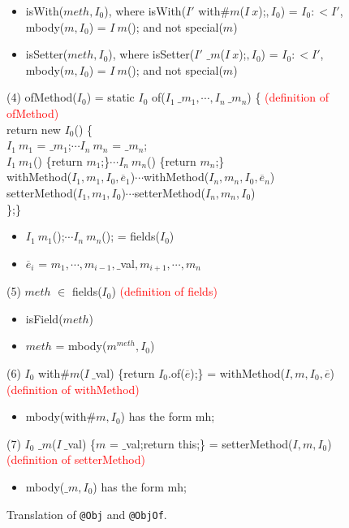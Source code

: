 \begin{figure*}
\begin{itemize}
    \item \textsf{isWith(}$meth,I_0$\textsf{)}, where \textsf{isWith(}$I'$ \textsf{with}$\#m$\textsf{(}$I\ x$\textsf{);}$,I_0$\textsf{)} = $I_0 :< I'$, \textsf{mbody(}$m,I_0$\textsf{)} = $I\ m$\textsf{();} and not \textsf{special(}$m$\textsf{)}
    \item \textsf{isSetter(}$meth,I_0$\textsf{)}, where \textsf{isSetter(}$I'$ $\_m$\textsf{(}$I\ x$\textsf{);}$,I_0$\textsf{)} = $I_0 :< I'$, \textsf{mbody(}$m,I_0$\textsf{)} = $I\ m$\textsf{();} and not \textsf{special(}$m$\textsf{)}
    \end{itemize}
(4) \textsf{ofMethod(}$I_0$\textsf{)} = \textsf{static }$I_0$\textsf{ of(}$I_1\ \_m_1,\cdots,I_n\ \_m_n$\textsf{) \{} \textcolor{red}{(definition of ofMethod)}
    \\ \textsf{return new }$I_0$\textsf{() \{}
    \\ $I_1\ m_1$ = $\_m_1$\textsf{;}$\cdots I_n\ m_n$ = $\_m_n$\textsf{;}
    \\ $I_1\ m_1$\textsf{() \{return }$m_1$\textsf{;\}}$\cdots I_n\ m_n$\textsf{() \{return }$m_n$\textsf{;\}}
    \\ \textsf{withMethod(}$I_1,m_1,I_0,\overline{e}_1$\textsf{)}$\cdots$\textsf{withMethod(}$I_n,m_n,I_0,\overline{e}_n$\textsf{)}
    \\ \textsf{setterMethod(}$I_1,m_1,I_0$\textsf{)}$\cdots$\textsf{setterMethod(}$I_n,m_n,I_0$\textsf{)}
    \\ \textsf{\};\}}
    \begin{itemize}
    \item $I_1\ m_1$\textsf{();}$\cdots I_n\ m_n$\textsf{();} = \textsf{fields(}$I_0$\textsf{)}
    \item $\overline{e}_i$ = $m_1,\cdots,m_{i-1},\_$\textsf{val}$,m_{i+1},\cdots,m_n$
    \end{itemize}
(5) $meth$ $\in$ \textsf{fields(}$I_0$\textsf{)} \textcolor{red}{(definition of fields)}
    \begin{itemize}
    \item \textsf{isField(}$meth$\textsf{)}
    \item $meth$ = \textsf{mbody(}$m^{meth},I_0$\textsf{)}
    \end{itemize}
(6) $I_0$ \textsf{with}$\#m$\textsf{(}$I\ \_$\textsf{val) \{return }$I_0$\textsf{.of(}$\overline{e}$\textsf{);\}} = \textsf{withMethod(}$I,m,I_0,\overline{e}$\textsf{)} \textcolor{red}{(definition of withMethod)}
    \begin{itemize}
    \item \textsf{mbody(with}$\#m,I_0$\textsf{)} has the form \textsf{mh;}
    \end{itemize}
(7) $I_0$ $\_m$\textsf{(}$I\ \_$\textsf{val) \{}$m$ = $\_$\textsf{val;return this;\}} = \textsf{setterMethod(}$I,m,I_0$\textsf{)} \textcolor{red}{(definition of setterMethod)}
    \begin{itemize}
    \item \textsf{mbody(}$\_m,I_0$\textsf{)} has the form \textsf{mh;}
    \end{itemize}
\caption{Translation of \lstinline{@Obj} and \lstinline{@ObjOf}.}
\label{fig:trans2}
\end{figure*}